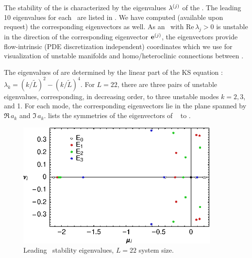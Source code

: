 The stability of the {\eqva} is characterized by the eigenvalues
$\eigExp[j]$ of the \stabmat.  The leading 10 eigenvalues for each
\eqv\ are listed in . We have computed (available upon request)
the corresponding eigenvectors as well. As an \eqv\ with $\mathrm{Re}\,
\lambda_j > 0$ is unstable in the direction of the corresponding
eigenvector ${\mathbf e}^{(j)}$, the eigenvectors provide flow-intrinsic
(PDE discretization independent) coordinates which we use for visualization
of unstable manifolds and homo/heteroclinic connections between
\eqva.

The eigenvalues of  are determined by the linear part of the KS
equation : $\lambda_k=(k/\tilde{L})^2-(k/\tilde{L})^4$.
For $L=22$, there are three pairs of unstable eigenvalues, corresponding,
in decreasing order, to three unstable modes $k=2,3$, and 1.  For each
mode, the corresponding eigenvectors lie in the plane spanned by
$\Re \, a_k$ and $\Im \, a_k$. 
lists the symmetries of the  eigenvectors of
\eqva\  to .

\begin{figure}[h!t]
\begin{center}
 \includegraphics[width=4in]{../figs/L22-eqvaEigenvalues}
\end{center}
\caption[Leading  \eqv\ stability eigenvalues]{
Leading  \eqv\ stability eigenvalues,
$L=22$ system size.
}
\label{f:KS22EkEigs}
\end{figure}

